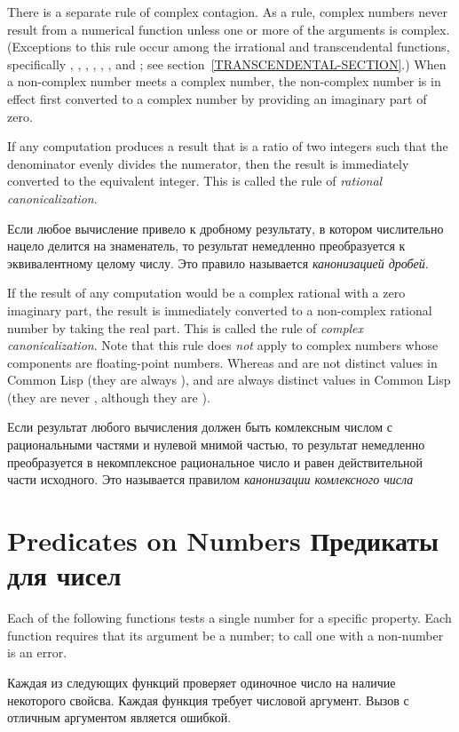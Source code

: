 There is a separate rule of complex contagion.
As a rule, complex numbers never result from a numerical function
unless one or more of the
arguments is complex.  (Exceptions to this
rule occur among the irrational and transcendental functions,
specifically , , ,
, , , and ;
see section~\ref{TRANSCENDENTAL-SECTION}.)
When a non-complex number meets a complex number, the non-complex
number is in effect first converted to a complex number by providing an
imaginary part of zero.

If any computation produces a result that is a ratio of
two integers such that the denominator evenly divides the
numerator, then the result is immediately converted to the equivalent
integer.  This is called the rule of \emph{rational canonicalization}.

Если любое вычисление привело к дробному результату, в котором числительно
нацело делится на знаменатель, то результат немедленно преобразуется к
эквивалентному целому числу. Это правило называется \emph{канонизацией дробей}.

If the result of any computation would be a complex rational
with a zero imaginary part, the result is immediately
converted to a non-complex rational number by taking the
real part.  This is called the rule of \emph{complex canonicalization}.
Note that this rule does \emph{not} apply to complex numbers whose components
are floating-point numbers.  Whereas  and  are not
distinct values in Common Lisp (they are always ),
 and  are always distinct values in Common Lisp
(they are never , although they are ).

Если результат любого вычисления должен быть комлексным числом с рациональными
частями и нулевой мнимой частью, то результат немедленно преобразуется в
некомплексное рациональное число и равен действительной части исходного.
Это называется правилом \emph{канонизации комлексного числа}

\section{Predicates on Numbers Предикаты для чисел}

Each of the following functions tests a single number for
a specific property.
Each function requires that its argument be
a number; to call one with a non-number is an error.

Каждая из следующих функций проверяет одиночное число на наличие некоторого
свойсва.
Каждая функция требует числовой аргумент. Вызов с отличным аргументом является
ошибкой.

